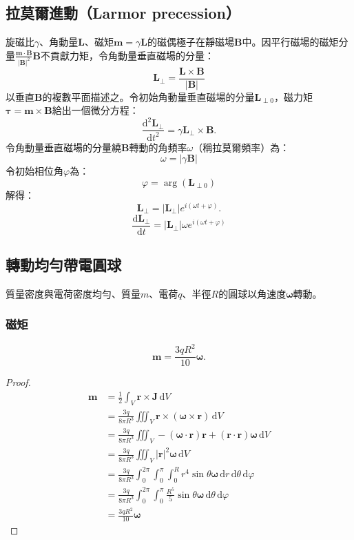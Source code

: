 \documentclass[a4paper,12pt]{report}
\begin{document}
\begin{itemize}
\subsection{拉莫爾進動（Larmor precession）}
旋磁比$\gamma$、角動量$\mathbf{L}$、磁矩$\mathbf{m}=\gamma\mathbf{L}$的磁偶極子在靜磁場$\mathbf{B}$中。因平行磁場的磁矩分量$\frac{\mathbf{m}\cdot\mathbf{B}}{|\mathbf{B}|^2}\mathbf{B}$不貢獻力矩，令角動量垂直磁場的分量：
\[\mathbf{L}_{\perp}=\frac{\mathbf{L}\times\mathbf{B}}{|\mathbf{B}|}\]
以垂直$\mathbf{B}$的複數平面描述之。令初始角動量垂直磁場的分量$\mathbf{L}_{\perp0}$，磁力矩$\boldsymbol{\tau}=\mathbf{m}\times\mathbf{B}$給出一個微分方程：
\[\frac{\mathrm{d}^2\mathbf{L}_{\perp}}{\mathrm{d}t^2}=\gamma\mathbf{L}_{\perp}\times\mathbf{B}.\]
令角動量垂直磁場的分量繞$\mathbf{B}$轉動的角頻率$\omega$（稱拉莫爾頻率）為：
\[\omega=|\gamma\mathbf{B}|\]
令初始相位角$\varphi$為：
\[\varphi=\arg(\mathbf{L}_{\perp0})\]
解得：
\[\mathbf{L}_{\perp}=|\mathbf{L}_{\perp}|e^{i(\omega t+\varphi)}.\]
\[\frac{\mathrm{d}\mathbf{L}_{\perp}}{\mathrm{d}t}=|\mathbf{L}_{\perp}|\omega e^{i(\omega t+\varphi)}\]
\subsection{轉動均勻帶電圓球}
質量密度與電荷密度均勻、質量$m$、電荷$q$、半徑$R$的圓球以角速度$\boldsymbol{\omega}$轉動。
\subsubsection{磁矩}
\[\mathbf{m}=\frac{3qR^2}{10}\boldsymbol{\omega}.\]
\begin{proof}
\[\begin{aligned}
\mathbf{m}&=\frac{1}{2}\int_V \mathbf{r}\times\mathbf{J}\,\mathrm{d}V\\
&=\frac{3q}{8\pi R^3}\iiint_V\mathbf{r}\times(\boldsymbol{\omega}\times\mathbf{r})\,\mathrm{d}V\\
&=\frac{3q}{8\pi R^3}\iiint_V-(\boldsymbol{\omega}\cdot\mathbf{r})\mathbf{r}+(\mathbf{r}\cdot\mathbf{r})\boldsymbol{\omega}\,\mathrm{d}V\\
&=\frac{3q}{8\pi R^3}\iiint_V|\mathbf{r}|^2\boldsymbol{\omega}\,\mathrm{d}V\\
&=\frac{3q}{8\pi R^3}\int_0^{2\pi}\int_0^{\pi}\int_0^Rr^4\sin\theta\boldsymbol{\omega}\,\mathrm{d}r\,\mathrm{d}\theta\,\mathrm{d}\varphi\\
&=\frac{3q}{8\pi R^3}\int_0^{2\pi}\int_0^{\pi}\frac{R^5}{5}\sin\theta\boldsymbol{\omega}\,\mathrm{d}\theta\,\mathrm{d}\varphi\\
&=\frac{3qR^2}{10}\boldsymbol{\omega}
\end{aligned}\]
\end{proof}

\end{itemize}
\end{document}
